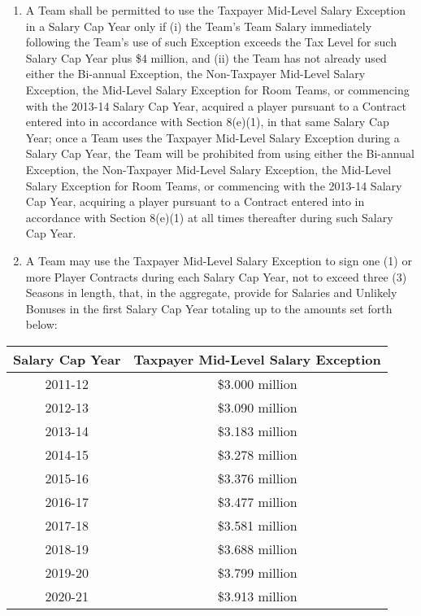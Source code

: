 \documentclass[
]{book}
\providecommand{\tightlist}{%
  \setlength{\itemsep}{0pt}\setlength{\parskip}{0pt}}
\begin{document}
\begin{enumerate}
  \begin{enumerate}
  \def\labelenumii{(\arabic{enumii})}
  \tightlist
  \item
    A Team shall be permitted to use the Taxpayer Mid-Level Salary Exception in a Salary Cap Year only if (i) the Team's Team Salary immediately following the Team's use of such Exception exceeds the Tax Level for such Salary Cap Year plus \$4 million, and (ii) the Team has not already used either the Bi-annual Exception, the Non-Taxpayer Mid-Level Salary Exception, the Mid-Level Salary Exception for Room Teams, or commencing with the 2013-14 Salary Cap Year, acquired a player pursuant to a Contract entered into in accordance with Section 8(e)(1), in that same Salary Cap Year; once a Team uses the Taxpayer Mid-Level Salary Exception during a Salary Cap Year, the Team will be prohibited from using either the Bi-annual Exception, the Non-Taxpayer Mid-Level Salary Exception, the Mid-Level Salary Exception for Room Teams, or commencing with the 2013-14 Salary Cap Year, acquiring a player pursuant to a Contract entered into in accordance with Section 8(e)(1) at all times thereafter during such Salary Cap Year.
  \item
    A Team may use the Taxpayer Mid-Level Salary Exception to sign one (1) or more Player Contracts during each Salary Cap Year, not to exceed three (3) Seasons in length, that, in the aggregate, provide for Salaries and Unlikely Bonuses in the first Salary Cap Year totaling up to the amounts set forth below:
  \end{enumerate}

  \begin{longtable}[]{@{}cc@{}}
  \toprule()
  Salary Cap Year & Taxpayer Mid-Level Salary Exception \\
  \midrule()
  \endhead
  2011-12 & \$3.000 million \\
  2012-13 & \$3.090 million \\
  2013-14 & \$3.183 million \\
  2014-15 & \$3.278 million \\
  2015-16 & \$3.376 million \\
  2016-17 & \$3.477 million \\
  2017-18 & \$3.581 million \\
  2018-19 & \$3.688 million \\
  2019-20 & \$3.799 million \\
  2020-21 & \$3.913 million \\
  \bottomrule()
  \end{longtable}


\end{enumerate}
\end{document}
